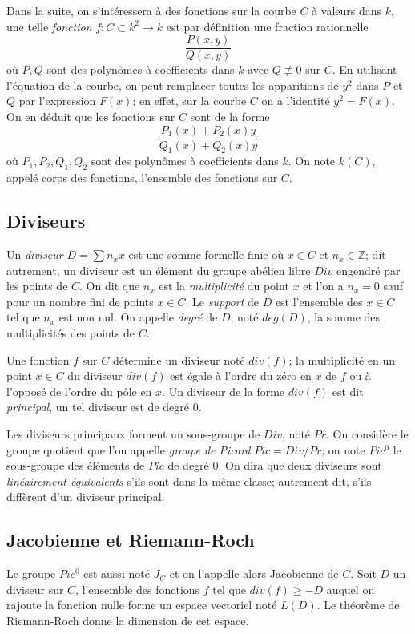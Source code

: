\documentclass[a4paper]{article}
\theoremstyle{definition}
\theoremstyle{remark}
\numberwithin{equation}{section}
\begin{document}
Dans la suite, on s'intéressera à des fonctions sur la courbe $C$ à valeurs dans $k$, une telle \emph{fonction} $f : C \subset k^2 \longrightarrow k$ est par définition une fraction rationnelle $$\frac{P(x,y)}{Q(x,y)}$$ où $P,Q$ sont des polynômes à coefficients dans $k$ avec $Q \not\equiv 0$ sur $C$. En utilisant l'équation de la courbe, on peut remplacer toutes les apparitions de $y^2$ dans $P$ et $Q$ par l'expression $F(x)$; en effet, sur la courbe $C$ on a l'identité $y^2 = F(x)$. On en déduit que les fonctions sur $C$ sont de la forme $$\frac{P_1(x) + P_2(x)y}{Q_1(x) + Q_2(x)y}$$ où $P_1,P_2,Q_1,Q_2$ sont des polynômes à coefficients dans $k$. On note $k(C)$, appelé corps des fonctions, l'ensemble des fonctions sur $C$.

\subsection{Diviseurs}
Un \emph{diviseur} $D = \sum n_x x$ est une somme formelle finie où $x \in C$ et $n_x \in \mathbb{Z}$; dit autrement, un diviseur est un élément du groupe abélien libre $Div$ engendré par les points de $C$. On dit que $n_x$ est la \emph{multiplicité} du point $x$ et l'on a $n_x = 0$ sauf pour un nombre fini de points $x \in C$. Le \emph{support} de $D$ est l'ensemble des $x \in C$ tel que $n_x$ est non nul. On appelle \emph{degré} de $D$, noté $deg(D)$, la somme des multiplicités des points de $C$.

Une fonction $f$ sur $C$ détermine un diviseur noté $div(f)$; la multiplicité en un point $x \in C$ du diviseur $div(f)$ est égale à l'ordre du zéro en $x$ de $f$ ou à l'opposé de l'ordre du pôle en $x$. Un diviseur de la forme $div(f)$ est dit \emph{principal}, un tel diviseur est de degré 0.

Les diviseurs principaux forment un sous-groupe de $Div$, noté $Pr$. On considère le groupe quotient que l'on appelle \emph{groupe de Picard} $Pic = Div/Pr$; on note $Pic^0$ le sous-groupe des éléments de $Pic$ de degré 0. On dira que deux diviseurs sont \emph{linéairement équivalents} s'ils sont dans la même classe; autrement dit, s'ils diffèrent d'un diviseur principal.

\subsection{Jacobienne et Riemann-Roch}
Le groupe $Pic^0$ est aussi noté $J_C$ et on l'appelle alors Jacobienne de $C$. Soit $D$ un diviseur sur $C$,
l'ensemble des fonctions $f$ tel que $div(f) \geq -D$ auquel on rajoute la fonction nulle forme un espace vectoriel noté $L(D)$.
Le théorème de Riemann-Roch donne la dimension de cet espace.
\end{document}
